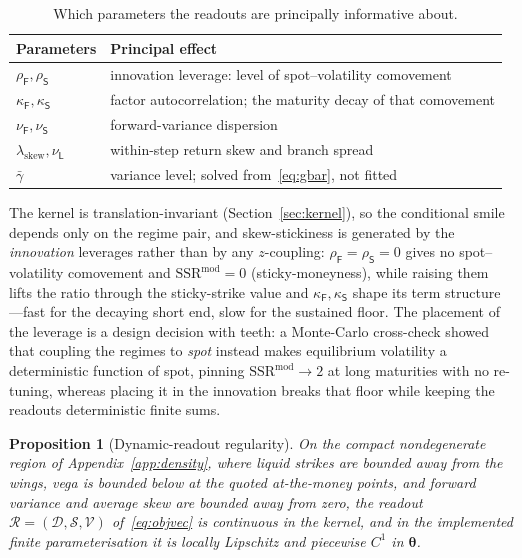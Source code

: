 \documentclass[11pt]{article}
\newtheorem{proposition}[theorem]{Proposition}
\newcommand{\SSR}{\mathrm{SSR}}
\newcommand{\SSRmod}{\SSR^{\mathrm{mod}}}
\providecommand{\1}{\mathbf 1}
\newcommand{\bth}{{\boldsymbol{\theta}}}
\begin{document}
\begin{table}[htbp]
\centering\small
\begin{tabular}{p{} p{}}
\toprule
Parameters & Principal effect \\
\midrule
$\rho_{\mathsf F},\rho_{\mathsf S}$ & innovation leverage: level of spot--volatility comovement \\[2pt]
$\kappa_{\mathsf F},\kappa_{\mathsf S}$ & factor autocorrelation; the maturity decay of that comovement \\[2pt]
$\nu_{\mathsf F},\nu_{\mathsf S}$ & forward-variance dispersion \\[2pt]
$\lambda_{\mathrm{skew}},\nu_{\mathsf L}$ & within-step return skew and branch spread \\[2pt]
$\bar\gamma$ & variance level; solved from~\eqref{eq:gbar}, not fitted \\
\bottomrule
\end{tabular}
\caption{Which parameters the readouts are principally informative about.}
\label{tab:paramroles}
\end{table}

The kernel is translation-invariant (Section~\ref{sec:kernel}), so the conditional smile depends
only on the regime pair, and skew-stickiness is generated by the \emph{innovation} leverages rather
than by any $z$-coupling: $\rho_{\mathsf F}=\rho_{\mathsf S}=0$ gives no spot--volatility
comovement and $\SSRmod=0$ (sticky-moneyness), while raising them lifts the ratio through the
sticky-strike value and $\kappa_{\mathsf F},\kappa_{\mathsf S}$ shape its term structure---fast for
the decaying short end, slow for the sustained floor. The placement of the leverage is a design
decision with teeth: a Monte-Carlo cross-check showed that coupling the regimes to \emph{spot}
instead makes equilibrium volatility a deterministic function of spot, pinning $\SSRmod\to2$ at long
maturities with no re-tuning, whereas placing it in the innovation breaks that floor while keeping
the readouts deterministic finite sums.

\begin{proposition}[Dynamic-readout regularity]
\label{prop:readout}
On the compact nondegenerate region of Appendix~\ref{app:density}, where liquid strikes are
bounded away from the wings, vega is bounded below at the quoted at-the-money points, and forward variance and average
skew are bounded away from zero, the readout
$\mathcal R=(\mathcal D,\mathcal S,\mathcal V)$ of~\eqref{eq:objvec} is continuous in the kernel, and in the implemented finite parameterisation it
is locally Lipschitz and piecewise $C^1$ in $\bth$.
\end{proposition}
\end{document}

